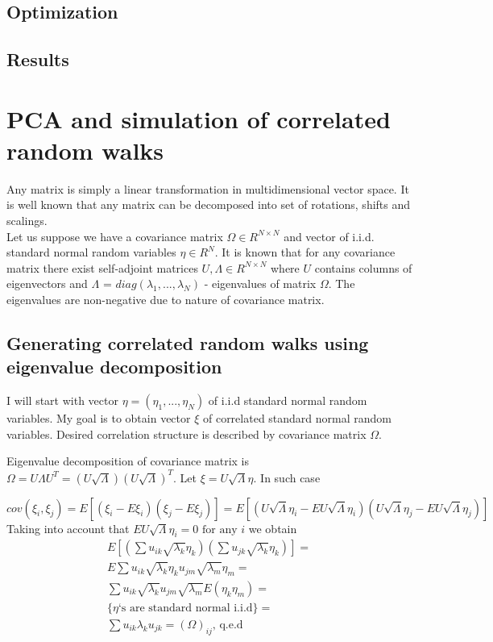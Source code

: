 \documentclass[11pt]{article} %
\newcommand{\euley}{U\sqrt{\Lambda}\eta}
\newcommand{\uley}[1]{\euley_#1}
\begin{document}
\subsection{Optimization}

\subsection{Results}

\appendix

\section{PCA and simulation of correlated random walks}
\label{ap:PCA}

Any matrix is simply a linear transformation in multidimensional vector space. It is well known that any matrix can be decomposed into set of rotations, shifts and scalings. \\

Let us suppose we have a covariance matrix $\Omega \in R^{N \times N}$ and vector of i.i.d. standard normal random variables $\eta \in R^N$. It is known that for any covariance matrix there exist self-adjoint matrices $U, \Lambda \in R^{N \times N}$ where $U$ contains columns of eigenvectors and $\Lambda \text{ = } diag(\lambda_1, ..., \lambda_N)$ - eigenvalues of matrix $\Omega$. The eigenvalues are non-negative due to nature of covariance matrix.


\subsection{Generating correlated random walks using eigenvalue decomposition}
I will start with vector $\eta = (\eta_1, ..., \eta_N)$ of i.i.d standard normal random variables. My goal is to obtain vector $\xi$ of correlated standard normal random variables. Desired correlation structure is described by covariance matrix $\Omega$.

Eigenvalue decomposition of covariance matrix is $\Omega = U \Lambda U^T = \left(U\sqrt{\Lambda}\right) \left(U\sqrt{\Lambda}\right)^T$. Let $\xi =\euley$. In such case

\begin{equation}
cov(\xi_i,\xi_j) = 
E\left[(\xi_i-E\xi_i)(\xi_j-E\xi_j)\right] =
E\left[\left(\uley{i}-E\uley{i}\right)\left(\uley{j}-E\uley{j}\right)\right]  \nonumber 
\end{equation}
Taking into account that $E\uley{i} = 0 \text{ for any } i$ we obtain
\begin{multline}
E\left[\left(\sum{u_{ik}\sqrt{\lambda_k}\eta_k}\right)\left(\sum{u_{jk}\sqrt{\lambda_k}\eta_k}\right)\right] = \\
E\sum{u_{ik}\sqrt{\lambda_k}\eta_k u_{jm}\sqrt{\lambda_m}\eta_m} = \\
\sum{u_{ik}\sqrt{\lambda_k}u_{jm}\sqrt{\lambda_m}E(\eta_k\eta_m)} = \\
 \{\eta\text{`s are standard normal i.i.d}\} = \\
\sum{u_{ik}\lambda_ku_{jk}} = \left(\Omega\right)_{ij} \text{, q.e.d}
\end{multline}
\end{document}
